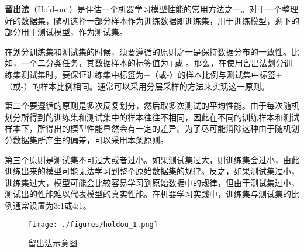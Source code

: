 
\begin{issues}
\issueDraft
\end{issues}

\textbf{留出法}（Hold-out）是评估一个机器学习模型性能的常用方法之一。对于一个整理好的数据集，随机选择一部分样本作为训练数据即训练集，用于训练模型，剩下的部分用于测试模型，作为测试集。

在划分训练集和测试集的时候，须要遵循的原则之一是保持数据分布的一致性。比如，一个二分类任务，其数据样本的标签值为+或-。那么，在使用留出法划分训练集测试集时，要保证训练集中标签为+（或-）的样本比例与测试集中标签+（或-）的样本比例相同。通常可以采用分层采样的方法来实现这一原则。

第二个要遵循的原则是多次反复划分，然后取多次测试的平均性能。由于每次随机划分所得到的训练集和测试集中的样本往往不相同，因此在不同的训练样本和测试样本下，所得出的模型性能显然会有一定的差异。为了尽可能消除这种由于随机划分数据集所产生的偏差，可以采用本条原则。

第三个原则是测试集不可过大或者过小。如果测试集过大，则训练集会过小，由此训练出来的模型可能无法学习到整个原始数据集的规律。反之，如果测试集过小，训练集过大，模型可能会比较容易学习到原始数据中的规律，但由于测试集过小，测试出的性能难以代表模型的真实性能。在机器学习实践中，训练集与测试集的比例通常设置为3:1或4:1。


\begin{figure}[ht]
\centering
\texttt{[image: ./figures/holdou\_1.png]}
\caption{留出法示意图} \label{holdou_fig1}
\end{figure}